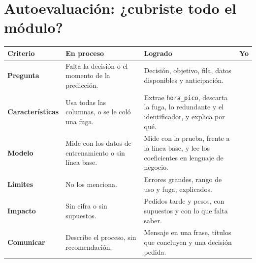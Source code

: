 \documentclass[11pt]{article}
\newcommand{\subtitulo}[1]{\par\needspace{3\baselineskip}\vspace{4pt}{\large\bfseries\color{esumerNavyDark} #1}\par}
\begin{document}
\section*{\color{esumerNavy}Autoevaluación: ¿cubriste todo el módulo?}

\small
\renewcommand{\arraystretch}{1.3}
\begin{tabularx}{\textwidth}{@{}>{\raggedright\arraybackslash}p{2.7cm} >{\raggedright\arraybackslash}X >{\raggedright\arraybackslash}X >{\centering\arraybackslash}p{0.9cm}@{}}
\toprule
\textbf{Criterio} & \textbf{En proceso} & \textbf{Logrado} & \textbf{Yo}\\
\midrule
\textbf{Pregunta} & Falta la decisión o el momento de la predicción. & Decisión, objetivo, fila, datos disponibles y anticipación. & \\
\textbf{Características} & Usa todas las columnas, o se le coló una fuga. & Extrae \texttt{hora\_pico}, descarta la fuga, lo redundante y el identificador, y explica por qué. & \\
\textbf{Modelo} & Mide con los datos de entrenamiento o sin línea base. & Mide con la prueba, frente a la línea base, y lee los coeficientes en lenguaje de negocio. & \\
\textbf{Límites} & No los menciona. & Errores grandes, rango de uso y fuga, explicados. & \\
\textbf{Impacto} & Sin cifra o sin supuestos. & Pedidos tarde y pesos, con supuestos y con lo que falta saber. & \\
\textbf{Comunicar} & Describe el proceso, sin recomendación. & Mensaje en una frase, títulos que concluyen y una decisión pedida. & \\
\bottomrule
\end{tabularx}\par
\renewcommand{\arraystretch}{1.0}
\normalsize

\subtitulo{Si algo no cuadra}
\end{document}
